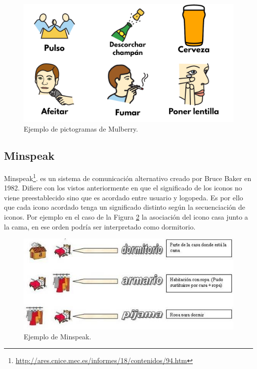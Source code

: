 \begin{figure}[h!]
	\centering
	\includegraphics[scale=0.2]{Imagenes/Bitmap/Mulberry}
	\caption{Ejemplo de pictogramas de Mulberry.}
	\label{fig:mulberry}
\end{figure}


\subsection{Minspeak}
Minspeak\footnote{\url{http://ares.cnice.mec.es/informes/18/contenidos/94.htm}}. es un sistema de comunicación alternativo creado por Bruce Baker en 1982. Difiere con los vistos anteriormente en que el significado de los iconos no viene preestablecido sino que es acordado entre usuario y logopeda. Es por ello que cada icono acordado tenga un significado distinto según la secuenciación de iconos. Por ejemplo en el caso de la Figura \ref{fig:minspeak} la asociación del icono casa junto a la cama, en ese orden podría ser interpretado como dormitorio. 

\begin{figure}[h!]
	\centering
	\includegraphics[width=0.9\linewidth]{Imagenes/Bitmap/Minspeak}
	\caption{Ejemplo de Minspeak.}
	\label{fig:minspeak}
\end{figure}

